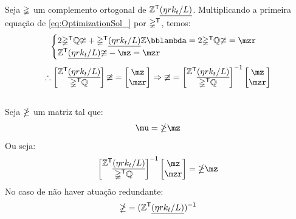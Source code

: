 \documentclass[a4paper,11pt,brazil,fleqn]{article}
\begin{document}
Seja $\mathbb{\Psi}$ um complemento ortogonal de $\mathbb{Z}^{\mathsf{T}}  \underline{(\eta r k_t / L)}$. Multiplicando a primeira equa\c{c}\~ao de \eqref{eq:OptimizationSol_} por $\mathbb{\Psi}^{\mathsf{T}}$, temos:
\begin{equation} \label{eq:OptimizationSol_2}
\begin{cases}
2 \mPsi^\msT \mQ \mup + \mPsi^\msT \underline{(\eta r k_t / L)} \mZ \mlambda = 2 \mPsi^\msT \mQ \mup = \mzr \\
\mZ^\msT  \underline{(\eta r k_t / L)} \mup - \mz = \mzr
\end{cases}
\end{equation}
\begin{equation} \label{eq:OptimizationSol_3}
\therefore
\begin{bmatrix}
\mZ^\msT  \underline{(\eta r k_t / L)} \\
\mPsi^\msT \mQ
\end{bmatrix}
\mup = 
\begin{bmatrix}
\mz \\
\mzr
\end{bmatrix}
\Rightarrow
\mup =
\begin{bmatrix}
\mZ^\msT  \underline{(\eta r k_t / L)} \\
\mPsi^\msT \mQ
\end{bmatrix}^\msI
\begin{bmatrix}
\mz \\
\mzr
\end{bmatrix}
\end{equation} \\

Seja $\mathbb{\Lambda}$ um matriz tal que:
\begin{equation} \label{eq:mupexplicito}
\mu = \mLambda \mz
\end{equation}
Ou seja:
\begin{equation}
\begin{bmatrix}
\mZ^\msT  \underline{(\eta r k_t / L)} \\
\mPsi^\msT \mQ
\end{bmatrix}^\msI
\begin{bmatrix}
\mz \\
\mzr
\end{bmatrix}
= \mLambda \mz
\end{equation}
No caso de n\~ao haver atua\c{c}\~ao redundante:
\begin{equation}
\mathbb{\Lambda} = ( \mathbb{Z}^{\mathsf{T}}  \underline{(\eta r k_t / L)} )^{\mathsf{-1}}
\end{equation}
\end{document}
